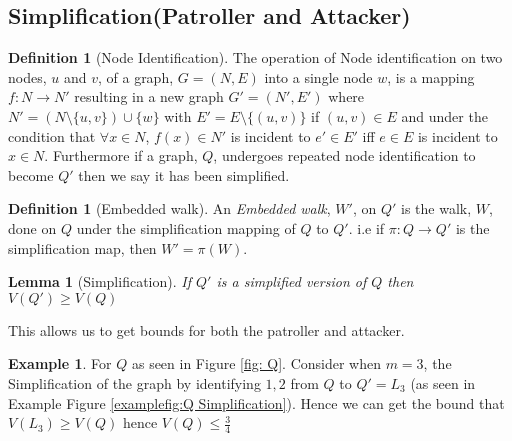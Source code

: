 \documentclass[a4paper,10pt]{article}
\newtheorem{lemma}[theorem]{Lemma}
\theoremstyle{definition}
\newtheorem{definition}[theorem]{Definition}
\theoremstyle{definition}
\newtheorem{example}[theorem]{Example}
\theoremstyle{remark}
\theoremstyle{definition}
\begin{document}
\subsection{Simplification(Patroller and Attacker)}

\begin{definition}[Node Identification]
The operation of Node identification on two nodes, $u$ and $v$, of a graph, $G=(N,E)$ into a single node $w$, is a mapping $f:N \rightarrow N'$ resulting in a new graph $G'=(N',E')$ where $N'=(N \setminus  \{u,v\}) \cup \{w\}$ with $E'=E \setminus \{(u,v)\}$ if $(u,v) \in E$ and under the condition that $\forall x \in N$, $f(x) \in N'$ is incident to $e' \in E'$ iff $e \in E$ is incident to $x \in N$.
Furthermore if a graph, $Q$, undergoes repeated node identification to become $Q'$ then we say it has been simplified. 
\end{definition}

\begin{definition}[Embedded walk]
An \textit{Embedded walk}, $W'$, on $Q'$ is the walk, $W$, done on $Q$ under the simplification mapping of $Q$ to $Q'$. i.e if $\pi :Q \rightarrow Q'$ is the simplification map, then $W'=\pi (W)$.
\end{definition}

\begin{lemma}[Simplification]
If $Q'$ is a simplified version of $Q$ then $V(Q') \geq V(Q)$
\end{lemma}

This allows us to get bounds for both the patroller and attacker.

\begin{example}
For $Q$ as seen in Figure \ref{fig: Q}. Consider when $m=3$, the Simplification of the graph by identifying $1,2$ from $Q$ to $Q'=L_{3}$ (as seen in Example Figure \ref{examplefig:Q Simplification}). Hence we can get the bound that $V(L_{3}) \geq  V(Q)$ hence $V(Q) \leq \frac{3}{4} $
\end{example}
\end{document}
